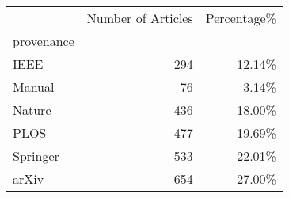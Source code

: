 \begin{tabular}{lrr}
\toprule
{} &  Number of Articles &  Percentage\%\\
provenance &                     &            \\
\midrule
IEEE       &                 294 &       12.14\%\\
Manual     &                  76 &        3.14\%\\
Nature     &                 436 &       18.00\%\\
PLOS       &                 477 &       19.69\%\\
Springer   &                 533 &       22.01\%\\
arXiv      &                 654 &       27.00\%\\
\bottomrule
\end{tabular}
